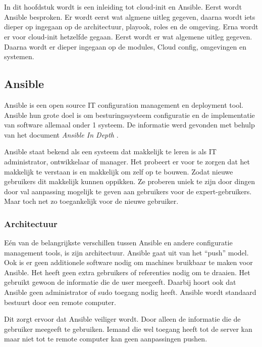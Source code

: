 \chapter{}
\label{ch:inleidingtotansibleencloudinit}

In dit hoofdstuk wordt is een inleiding tot cloud-init en Ansible. Eerst wordt Ansible besproken. Er wordt eerst wat algmene uitleg gegeven, daarna wordt iets dieper op ingegaan op de architectuur, playook, roles en de omgeving. Erna wordt er voor cloud-init hetzelfde gegaan. Eerst wordt er wat algemene uitleg gegeven. Daarna wordt er dieper ingegaan op de modules, Cloud config, omgevingen en systemen.


\section{Ansible}
Ansible is een open source IT configuration management en deployment tool. Ansible hun grote doel is om besturingssysteem configuratie en de implementatie van software allemaal onder 1 systeem. De informatie werd gevonden met behulp van het document \textit{Ansible In Depth} \autocite{ansibleid}.

Ansible staat bekend als een systeem dat makkelijk te leren is als IT administrator, ontwikkelaar of manager. Het probeert er voor te zorgen dat het makkelijk te verstaan is en makkelijk om zelf op te bouwen. Zodat nieuwe gebruikers dit makkelijk kunnen oppikken. Ze proberen uniek te zijn door dingen door val aanpassing mogelijk te geven aan gebruikers voor de expert-gebruikers. Maar toch net zo toegankelijk voor de nieuwe gebruiker.

\subsection{Architectuur}
Eén van de belangrijkste verschillen tussen Ansible en andere configuratie management tools, is zijn architectuur. Ansible gaat uit van het ``push'' model. Ook is er geen additionele software nodig om machines bruikbaar te maken voor Ansible. Het heeft geen extra gebruikers of referenties nodig om te draaien. Het gebruikt gewoon de informatie die de user meegeeft. Daarbij hoort ook dat Ansible geen administrator of sudo toegang nodig heeft. Ansible wordt standaard bestuurt door een remote computer.

Dit zorgt ervoor dat Ansible veiliger wordt. Door alleen de informatie die de gebruiker meegeeft te gebruiken. Iemand die wel toegang heeft tot de server kan maar niet tot te remote computer kan geen aanpassingen pushen.

